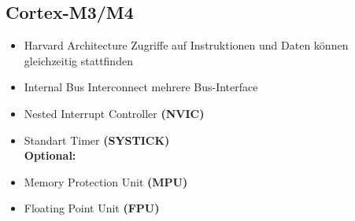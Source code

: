 \subsection{Cortex-M3/M4}
\begin{multicols}{2}
    \begin{itemize}
        \item Harvard Architecture
            \subitem \rightarrow  Zugriffe auf Instruktionen und Daten
            \subitem \qquad können gleichzeitig stattfinden
        \item Internal Bus Interconnect
            \subitem \rightarrow mehrere Bus-Interface 
        \item Nested Interrupt Controller \textbf{(NVIC)}
        \item Standart Timer \textbf{(SYSTICK)}\\
        \textbf{Optional:}
        \item Memory Protection Unit \textbf{(MPU)}
        \item Floating Point Unit \textbf{(FPU)}
    \end{itemize}
\end{multicols}

